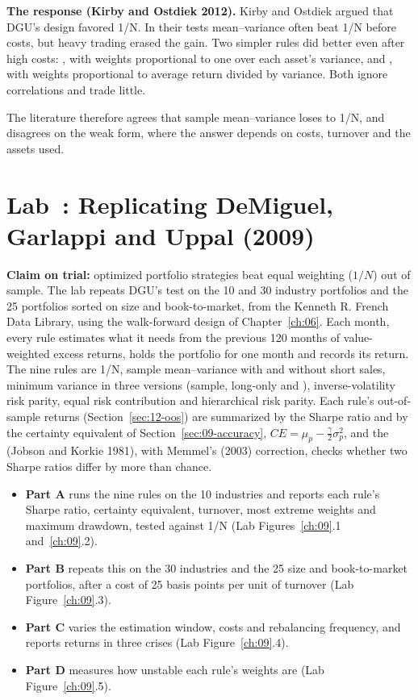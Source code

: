 \textbf{The response (Kirby and Ostdiek 2012).} Kirby and Ostdiek argued that DGU's design favored 1/N. In their tests mean--variance often beat 1/N before costs, but heavy trading erased the gain. Two simpler rules did better even after high costs: , with weights proportional to one over each asset's variance, and , with weights proportional to average return divided by variance. Both ignore correlations and trade little.

The literature therefore agrees that sample mean--variance loses to 1/N, and disagrees on the weak form, where the answer depends on costs, turnover and the assets used.

\section{Lab~\thechapter: Replicating DeMiguel, Garlappi and Uppal (2009)}
\label{sec:12-lab}

\textbf{Claim on trial:} optimized portfolio strategies beat equal weighting ($1/N$) out of sample. The lab repeats DGU's test on the 10 and 30 industry portfolios and the 25 portfolios sorted on size and book-to-market, from the Kenneth R. French Data Library, using the walk-forward design of Chapter~\ref{ch:06}. Each month, every rule estimates what it needs from the previous 120 months of value-weighted excess returns, holds the portfolio for one month and records its return. The nine rules are 1/N, sample mean--variance with and without short sales, minimum variance in three versions (sample, long-only and ), inverse-volatility risk parity, equal risk contribution and hierarchical risk parity. Each rule's out-of-sample returns (Section~\ref{sec:12-oos}) are summarized by the Sharpe ratio and by the certainty equivalent of Section~\ref{sec:09-accuracy}, $CE = \mu_p - \frac{\gamma}{2}\sigma_p^2$, and the  (Jobson and Korkie 1981), with Memmel's (2003) correction, checks whether two Sharpe ratios differ by more than chance.

\begin{itemize}
  \item \textbf{Part A} runs the nine rules on the 10 industries and reports each rule's Sharpe ratio, certainty equivalent, turnover, most extreme weights and maximum drawdown, tested against 1/N (Lab Figures~\ref{ch:09}.1 and~\ref{ch:09}.2).
  \item \textbf{Part B} repeats this on the 30 industries and the 25 size and book-to-market portfolios, after a cost of 25 basis points per unit of turnover (Lab Figure~\ref{ch:09}.3).
  \item \textbf{Part C} varies the estimation window, costs and rebalancing frequency, and reports returns in three crises (Lab Figure~\ref{ch:09}.4).
  \item \textbf{Part D} measures how unstable each rule's weights are (Lab Figure~\ref{ch:09}.5).
\end{itemize}

